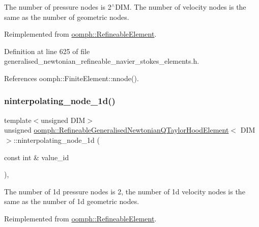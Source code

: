 The number of pressure nodes is 2$^\wedge$\+D\+IM. The number of velocity nodes is the same as the number of geometric nodes. 



Reimplemented from \hyperlink{classoomph_1_1RefineableElement_a8b1b5031b55141567ba24913a21534f4}{oomph\+::\+Refineable\+Element}.



Definition at line 625 of file generalised\+\_\+newtonian\+\_\+refineable\+\_\+navier\+\_\+stokes\+\_\+elements.\+h.



References oomph\+::\+Finite\+Element\+::nnode().

\mbox{\label{classoomph_1_1RefineableGeneralisedNewtonianQTaylorHoodElement_accecb785cec4dd63c6e4b1804c1697a5}} 
\subsubsection{\texorpdfstring{ninterpolating\+\_\+node\+\_\+1d()}{ninterpolating\_node\_1d()}}
{\footnotesize\ttfamily template$<$unsigned D\+IM$>$ \\
unsigned \hyperlink{classoomph_1_1RefineableGeneralisedNewtonianQTaylorHoodElement}{oomph\+::\+Refineable\+Generalised\+Newtonian\+Q\+Taylor\+Hood\+Element}$<$ D\+IM $>$\+::ninterpolating\+\_\+node\+\_\+1d (\begin{DoxyParamCaption}\item[{const int \&}]{value\+\_\+id }\end{DoxyParamCaption})\hspace{0.3cm}{\ttfamily [inline]}, {\ttfamily [virtual]}}



The number of 1d pressure nodes is 2, the number of 1d velocity nodes is the same as the number of 1d geometric nodes. 



Reimplemented from \hyperlink{classoomph_1_1RefineableElement_a850180084aaf164550b4f4978b42cda7}{oomph\+::\+Refineable\+Element}.



